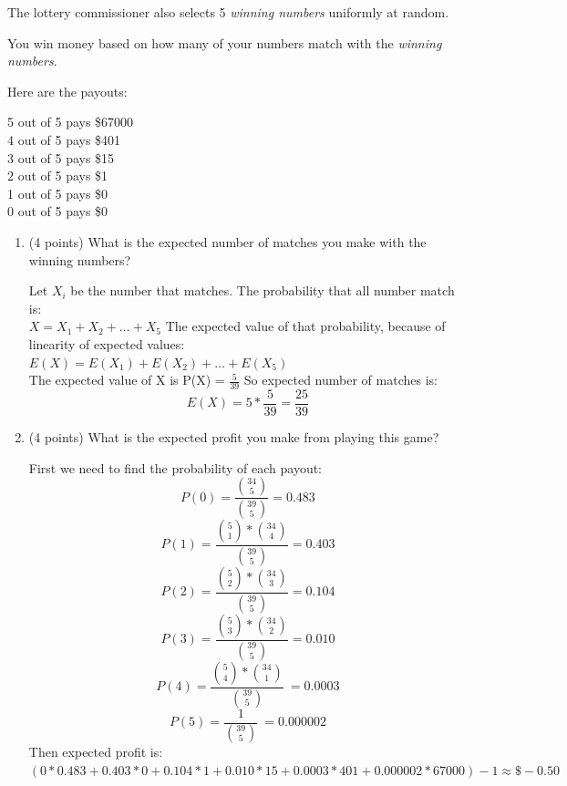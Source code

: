 \documentclass[10pt,letterpaper,unboxed,cm]{article}
\begin{document}
\begin{enumerate}
The lottery commissioner also selects 5 \emph{winning numbers} uniformly at random.

You win money based on how many of your numbers match with the \emph{winning numbers}.

Here are the payouts:

5 out of 5 pays \$67000\\
4 out of 5 pays \$401\\
3 out of 5 pays \$15\\
2 out of 5 pays \$1\\
1 out of 5 pays \$0\\
0 out of 5 pays \$0\\


\begin{enumerate}
\item (4 points)
What is the expected number of matches you make with the winning numbers?

\begin{solution}
    
    Let $X_i$ be the number that matches. The probability that all number match is:\\
    \(X = X_1 + X_2 + \dots + X_5\)
    The expected value of that probability, because of linearity of expected values:\\
    \(E(X) = E(X_1) + E(X_2) + \dots + E(X_5)\)\\
    The expected value of X is P(X) = $\frac{5}{39}$
    So expected number of matches is:
    \[\boxed{E(X) = 5*\frac{5}{39} = \frac{25}{39}}\]


\end{solution}

\item (4 points)
What is the expected profit you make from playing this game?

\begin{solution}

    First we need to find the probability of each payout:\\
    \[P(0) = \frac{\binom{34}{5}}{\binom{39}{5}} = 0.483\]
    \[P(1) = \frac{\binom{5}{1}*\binom{34}{4}}{\binom{39}{5}} = 0.403\]
    \[P(2) = \frac{\binom{5}{2}*\binom{34}{3}}{\binom{39}{5}} = 0.104\]
    \[P(3) = \frac{\binom{5}{3}*\binom{34}{2}}{\binom{39}{5}} = 0.010\]
    \[P(4) = \frac{\binom{5}{4}*\binom{34}{1}}{\binom{39}{5}}\ = 0.0003\]
    \[P(5) = \frac{1}{\binom{39}{5}}\ = 0.000002\]
    Then expected profit is:
    $(0 * 0.483 + 0.403 * 0 + 0.104 * 1 + 0.010 * 15 + 0.0003 * 401 + 0.000002 * 67000) - 1 \approx \boxed{\mathdollar-0.50}$



\end{solution}
\end{enumerate}
\end{enumerate}
\end{document}
